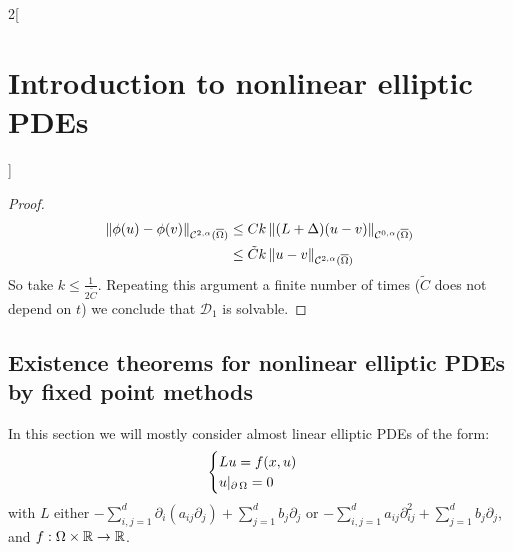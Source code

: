 \documentclass[../../../main_math.tex]{subfiles}
\begin{document}
\begin{multicols}{2}[\section{Introduction to nonlinear elliptic PDEs}]
\begin{proof}
    \begin{align*}
      \left\|\phi(u)-\phi(v)\right\|_{\mathcal{C}^{2,\alpha}(\overline{\Omega})} & \leq Ck\left\|(L+\Delta)(u-v)\right\|_{\mathcal{C}^{0,\alpha}(\overline{\Omega})} \\
                                                                         & \leq \tilde{C}k\left\|u-v\right\|_{\mathcal{C}^{2,\alpha}(\overline{\Omega})}
    \end{align*}
    So take $k\leq \frac{1}{2\tilde{C}}$. Repeating this argument a finite number of times ($\tilde{C}$ does not depend on $t$) we conclude that $\mathcal{D}_1$ is solvable.
  \end{proof}
  \subsection{Existence theorems for nonlinear elliptic PDEs by fixed point methods}
  In this section we will mostly consider almost linear elliptic PDEs of the form:
  \begin{equation}\label{INEPDE:AlmostLinear}
    \begin{cases}
      Lu=f(x,u) \\
      u|_{\operatorname{\partial}{\Omega}}=0
    \end{cases}
  \end{equation}
  with $L$ either $-\sum_{i,j=1}^d\partial_i(a_{ij}\partial_j)+\sum_{j=1}^db_j\partial_j$ or $-\sum_{i,j=1}^d a_{ij} \partial_{ij}^2+\sum_{j=1}^db_j\partial_j$, and $f:\Omega\times \mathbb{R}\to \mathbb{R}$.

\end{multicols}
\end{document}
